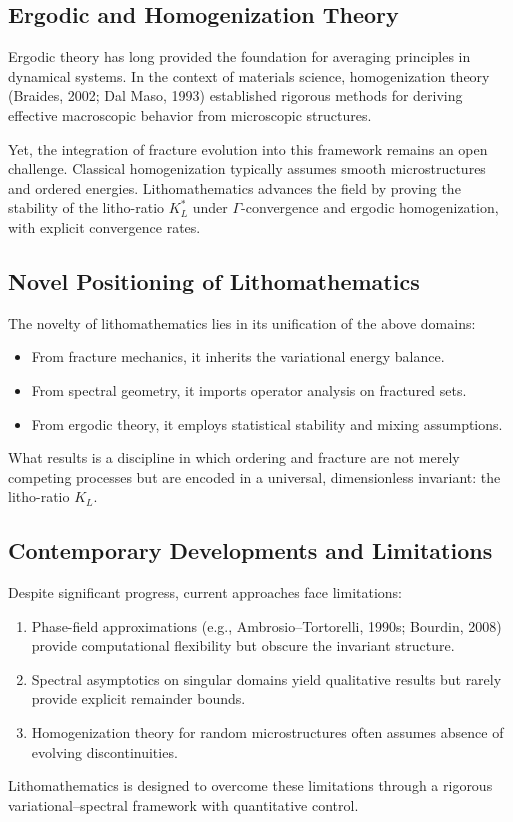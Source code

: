 \subsection*{Ergodic and Homogenization Theory}
Ergodic theory has long provided the foundation for averaging principles in
dynamical systems. In the context of materials science, homogenization theory
(Braides, 2002; Dal Maso, 1993) established rigorous methods for deriving
effective macroscopic behavior from microscopic structures.

Yet, the integration of fracture evolution into this framework remains an
open challenge. Classical homogenization typically assumes smooth microstructures
and ordered energies. Lithomathematics advances the field by proving the
stability of the litho-ratio $K_L^*$ under $\Gamma$-convergence and ergodic
homogenization, with explicit convergence rates.

\subsection*{Novel Positioning of Lithomathematics}
The novelty of lithomathematics lies in its unification of the above domains:
\begin{itemize}
  \item From fracture mechanics, it inherits the variational energy balance.
  \item From spectral geometry, it imports operator analysis on fractured sets.
  \item From ergodic theory, it employs statistical stability and mixing
  assumptions.
\end{itemize}
What results is a discipline in which ordering and fracture are not merely
competing processes but are encoded in a universal, dimensionless invariant:
the litho-ratio $K_L$.

\subsection*{Contemporary Developments and Limitations}
Despite significant progress, current approaches face limitations:
\begin{enumerate}[label=(\alph*)]
  \item Phase-field approximations (e.g., Ambrosio–Tortorelli, 1990s; Bourdin,
  2008) provide computational flexibility but obscure the invariant structure.
  \item Spectral asymptotics on singular domains yield qualitative results but
  rarely provide explicit remainder bounds.
  \item Homogenization theory for random microstructures often assumes absence
  of evolving discontinuities.
\end{enumerate}
Lithomathematics is designed to overcome these limitations through a rigorous
variational–spectral framework with quantitative control.

